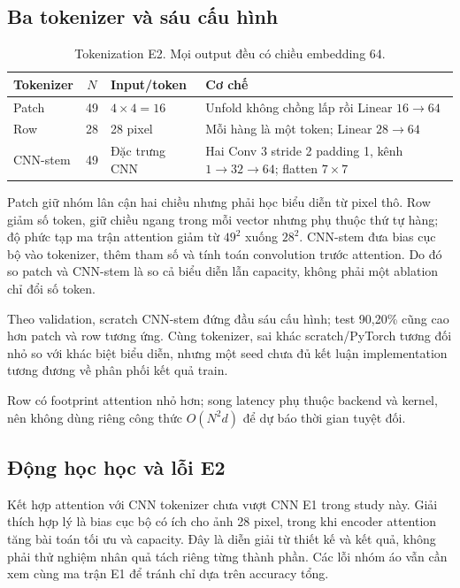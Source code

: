 \documentclass[11pt,a4paper]{article}
\begin{document}
\subsection{Ba tokenizer và sáu cấu hình}
\begin{table}[htbp]\centering\small\caption{Tokenization E2. Mọi output đều có chiều embedding 64.}
\begin{tabularx}{\linewidth}{lclX}\toprule Tokenizer & $N$ & Input/token & Cơ chế\\\midrule
Patch &49 &$4\times 4=16$ & Unfold không chồng lấp rồi Linear $16\to 64$\\
Row &28 &28 pixel & Mỗi hàng là một token; Linear $28\to 64$\\
CNN-stem &49 & Đặc trưng CNN & Hai Conv 3 stride 2 padding 1, kênh $1\to 32\to 64$; flatten $7\times 7$\\\bottomrule\end{tabularx}\end{table}

Patch giữ nhóm lân cận hai chiều nhưng phải học biểu diễn từ pixel thô. Row giảm số token, giữ chiều ngang trong mỗi vector nhưng phụ thuộc thứ tự hàng; độ phức tạp ma trận attention giảm từ $49^2$ xuống $28^2$. CNN-stem đưa bias cục bộ vào tokenizer, thêm tham số và tính toán convolution trước attention. Do đó so patch và CNN-stem là so cả biểu diễn lẫn capacity, không phải một ablation chỉ đổi số token.


Theo validation, scratch CNN-stem đứng đầu sáu cấu hình; test 90,20\% cũng cao hơn patch và row tương ứng. Cùng tokenizer, sai khác scratch/PyTorch tương đối nhỏ so với khác biệt biểu diễn, nhưng một seed chưa đủ kết luận implementation tương đương về phân phối kết quả train.

Row có footprint attention nhỏ hơn; song latency phụ thuộc backend và kernel, nên không dùng riêng công thức $O(N^2 d)$ để dự báo thời gian tuyệt đối.
\clearpage

\subsection{Động học học và lỗi E2}
Kết hợp attention với CNN tokenizer chưa vượt CNN E1 trong study này. Giải thích hợp lý là bias cục bộ có ích cho ảnh 28 pixel, trong khi encoder attention tăng bài toán tối ưu và capacity. Đây là diễn giải từ thiết kế và kết quả, không phải thử nghiệm nhân quả tách riêng từng thành phần. Các lỗi nhóm áo vẫn cần xem cùng ma trận E1 để tránh chỉ dựa trên accuracy tổng.
\clearpage
\end{document}
